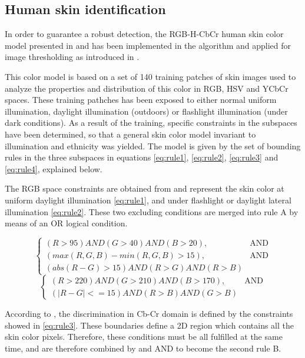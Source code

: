 \subsection{Human skin identification}
In order to guarantee a robust detection, the RGB-H-CbCr human skin color model presented
in \cite{Ref:SkinColorModel} and \cite{Ref:SkinDetection} has been implemented in the algorithm
and applied for image thresholding as introduced in \cite{Ref:SkinDetection}. 

This color model is based on a set of 140 training patches of skin images used to analyze the properties and
distribution of this color in RGB, HSV and YCbCr spaces.  These training pathches has been exposed
to either normal uniform illumination, daylight illumination (outdoors) or flashlight illumination (under dark conditions). 
As a result of the training, specific constraints in the subspaces have been determined,
so that a general skin color model invariant to illumination and ethnicity was yielded. 
The model is given by the set of bounding rules in the three subspaces in 
equations \ref{eq:rule1}, \ref{eq:rule2}, \ref{eq:rule3} and \ref{eq:rule4}, explained below.

The RGB space constraints are obtained from \cite{Ref:SkinColorModel} and represent the skin
color at uniform daylight illumination \ref{eq:rule1}, and under flashlight or daylight lateral
illumination \ref{eq:rule2}. These two excluding conditions are merged into rule A by means of an OR logical condition.

\begin{equation}
		\begin{cases}
		    (R > 95) AND (G > 40) AND (B > 20),& \text{AND}\\
		    (max(R, G, B) - min(R, G, B) > 15), & \text{AND}\\
		    (abs(R - G) > 15) AND (R > G) AND (R > B)
		\end{cases}
		\label{eq:rule1}
\end{equation}
\begin{equation}
		\begin{cases}
		    (R > 220) AND (G > 210) AND (B > 170),& \text{AND}\\
			(|R - G| <= 15) AND (R > B) AND (G > B)
		\end{cases}
	\label{eq:rule2}
\end{equation}

According to \cite{Ref:SkinDetection}, the discrimination in Cb-Cr domain is defined by the constraints showed in \ref{eq:rule3}.  
These boundaries define a 2D region which contains all the skin color pixels. 
Therefore, these conditions must be all fulfilled at the same time, and are therefore combined by and AND to become the second rule B.


